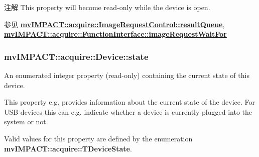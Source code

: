 \begin{DoxyNote}{注解}
This property will become read-\/only while the device is open.
\end{DoxyNote}
\begin{DoxySeeAlso}{参见}
{\bfseries \hyperlink{classmv_i_m_p_a_c_t_1_1acquire_1_1_image_request_control_a9a5ed0f41db0291bc13ebe37e09fb84d}{mv\+I\+M\+P\+A\+C\+T\+::acquire\+::\+Image\+Request\+Control\+::result\+Queue}}, ~\newline
{\bfseries \hyperlink{classmv_i_m_p_a_c_t_1_1acquire_1_1_function_interface_a4cefdfda8e8940736ae9a4c97b6de8c9}{mv\+I\+M\+P\+A\+C\+T\+::acquire\+::\+Function\+Interface\+::image\+Request\+Wait\+For}} 
\end{DoxySeeAlso}
\hypertarget{classmv_i_m_p_a_c_t_1_1acquire_1_1_device_a4861037a845148f813bc72bad7334ebd}{
\subsubsection[{state}]{ mv\+I\+M\+P\+A\+C\+T\+::acquire\+::\+Device\+::state}}\label{classmv_i_m_p_a_c_t_1_1acquire_1_1_device_a4861037a845148f813bc72bad7334ebd}


An enumerated integer property {\bfseries }(read-\/only) containing the current state of this device. 

This property e.\+g. provides information about the current state of the device. For U\+S\+B devices this can e.\+g. indicate whether a device is currently plugged into the system or not.

Valid values for this property are defined by the enumeration {\bfseries mv\+I\+M\+P\+A\+C\+T\+::acquire\+::\+T\+Device\+State}.

